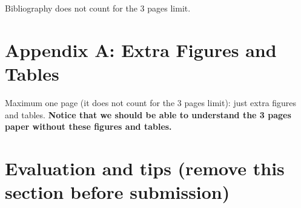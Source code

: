 \documentclass[twocolumn,10pt]{article}
\begin{document}


Bibliography does not count for the 3 pages limit.


\appendix

\section*{Appendix A: Extra Figures and Tables}

Maximum one page (it does not count for the 3 pages limit): just extra figures and tables. \textbf{Notice that we should be able to understand the 3 pages paper without these figures and tables.}

\section{Evaluation and tips (remove this section before submission)}
\end{document}
